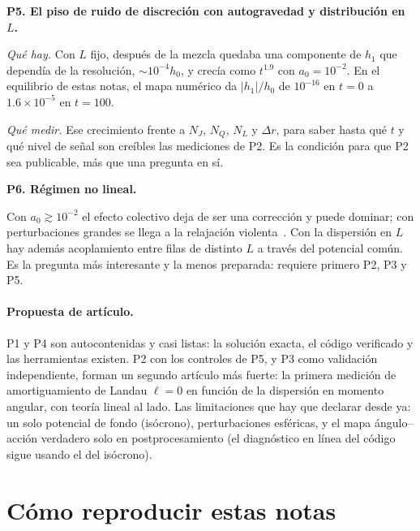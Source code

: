 \documentclass[11pt,a4paper]{article}
\begin{document}
\begin{pregunta}
\textbf{P5. El piso de ruido de discreción con autogravedad y distribución en $L$.}

\emph{Qué hay.} Con $L$ fijo, después de la mezcla quedaba una componente de $h_1$ que
dependía de la resolución, $\sim10^{-4}h_0$, y crecía como $t^{1.9}$ con $a_0=10^{-2}$. En el
equilibrio de estas notas, el mapa numérico da $|h_1|/h_0$ de $10^{-16}$ en $t=0$ a
$1.6\times10^{-5}$ en $t=100$.

\emph{Qué medir.} Ese crecimiento frente a $N_J$, $N_Q$, $N_L$ y $\Delta r$, para saber
hasta qué $t$ y qué nivel de señal son creíbles las mediciones de P2. Es la condición para
que P2 sea publicable, más que una pregunta en sí.
\end{pregunta}

\begin{pregunta}
\textbf{P6. Régimen no lineal.}

Con $a_0\gtrsim10^{-2}$ el efecto colectivo deja de ser una corrección y puede dominar;
con perturbaciones grandes se llega a la relajación violenta~\cite{lyndenbell1967}. Con la
dispersión en $L$ hay además acoplamiento entre filas de distinto $L$ a través del
potencial común. Es la pregunta más interesante y la menos preparada: requiere primero
P2, P3 y P5.
\end{pregunta}

\paragraph{Propuesta de artículo.} P1 y P4 son autocontenidas y casi listas: la solución
exacta, el código verificado y las herramientas existen. P2 con los controles de P5, y P3
como validación independiente, forman un segundo artículo más fuerte: la primera medición
de amortiguamiento de Landau $\ell=0$ en función de la dispersión en momento angular, con
teoría lineal al lado. Las limitaciones que hay que declarar desde ya: un solo potencial de
fondo (isócrono), perturbaciones esféricas, y el mapa ángulo--acción verdadero solo en
postprocesamiento (el diagnóstico en línea del código sigue usando el del isócrono).

\appendix
\section{Cómo reproducir estas notas}
\label{sec:reproducir}
\end{document}
